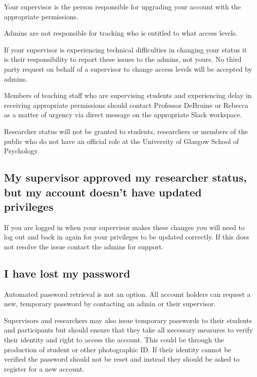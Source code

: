 \documentclass[]{book}
\begin{document}
Your supervisor is the person responsible for upgrading your account with the appropriate permissions.

Admins are not responsible for tracking who is entitled to what access levels.

If your supervisor is experiencing technical difficulties in changing your status it is their responsibility to report these issues to the admins, not yours. No third party request on behalf of a supervisor to change access levels will be accepted by admins.

Members of teaching staff who are supervising students and experiencing delay in receiving appropriate permissions should contact Professor DeBruine or Rebecca as a matter of urgency via direct message on the appropriate Slack workspace.

Researcher status will not be granted to students, researchers or members of the public who do not have an official role at the University of Glasgow School of Psychology.

\hypertarget{my-supervisor-approved-my-researcher-status-but-my-account-doesnt-have-updated-privileges}{%
\subsection*{My supervisor approved my researcher status, but my account doesn't have updated privileges}\label{my-supervisor-approved-my-researcher-status-but-my-account-doesnt-have-updated-privileges}}

If you are logged in when your supervisor makes these changes you will need to log out and back in again for your privileges to be updated correctly. If this does not resolve the issue contact the admins for support.

\hypertarget{i-have-lost-my-password}{%
\subsection*{I have lost my password}\label{i-have-lost-my-password}}

Automated password retrieval is not an option. All account holders can request a new, temporary password by contacting an admin or their supervisor.

Supervisors and researchers may also issue temporary passwords to their students and participants but should ensure that they take all necessary measures to verify their identity and right to access the account. This could be through the production of student or other photographic ID. If their identity cannot be verified the password should not be reset and instead they should be asked to register for a new account.
\end{document}
